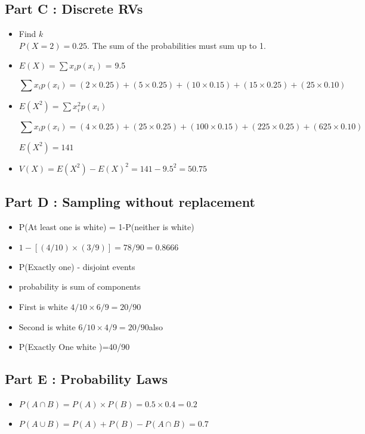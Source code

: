 \documentclass[]{article}
\begin{document}
\subsection*{Part C : Discrete RVs}
\begin{itemize}
\item Find $k$\\
$P(X=2) = 0.25$. The sum of the probabilities must sum up to 1.

\item $E(X) = \sum x_i p(x_i)$ = 9.5

\[\sum x_i p(x_i) = (2\times 0.25) + (5 \times 0.25) + (10 \times 0.15) + (15 \times 0.25) + (25 \times 0.10) \]



\item $E(X^2) = \sum x^2_i p(x_i)$

\[\sum x_i p(x_i) = (4\times 0.25) + (25 \times 0.25) + (100 \times 0.15) + (225 \times 0.25) + (625 \times 0.10) \]


$E(X^2) = 141$

\item $V(X) = E(X^2) - E(X)^2 = 141-9.5^2 = 50.75$
\end{itemize}

\subsection*{Part D : Sampling without replacement}

\begin{itemize}
\item P(At least one is white) = 1-P(neither is white)
\item $1- \left[(4/10)\times (3/9)\right]  = 78/90 = 0.8666$
\item P(Exactly one) - disjoint events
\item probability is sum of components
\item First is white $4/10 \times 6/9 =20/90$
\item Second is white $6/10 \times 4/9 =20/90 $also
\item P(Exactly One white )=40/90
\end{itemize}

\subsection*{Part E : Probability Laws}
\begin{itemize}
\item $P(A \cap B)  = P(A) \times P(B) = 0.5\times 0.4 = 0.2 $
\item $P(A \cup B)  = P(A) + P(B) - P(A \cap B) = 0.7$
\end{itemize}
\end{document}
